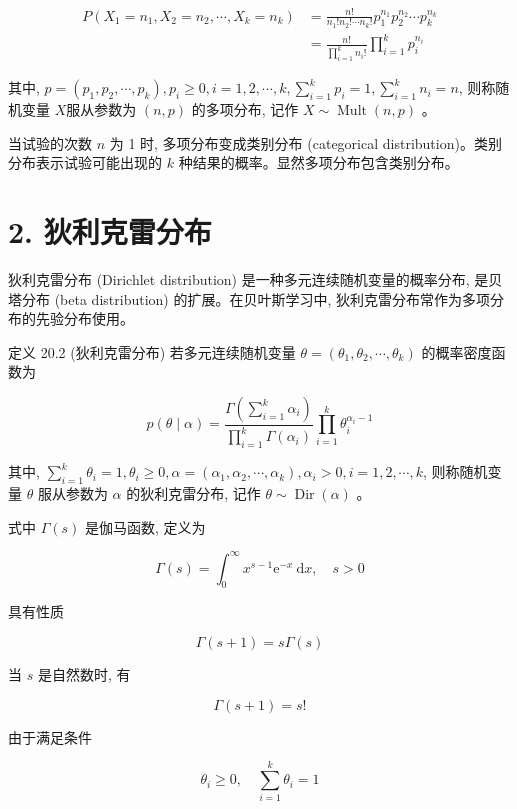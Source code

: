 \documentclass[10pt]{article}
\begin{document}
\begin{CJK*}{UTF8}{bsmi}
\begin{align*}
P\left(X_{1}=n_{1}, X_{2}=n_{2}, \cdots, X_{k}=n_{k}\right) & =\frac{n !}{n_{1} ! n_{2} ! \cdots n_{k} !} p_{1}^{n_{1}} p_{2}^{n_{2}} \cdots p_{k}^{n_{k}} \\
& =\frac{n !}{\prod_{i=1}^{k} n_{i} !} \prod_{i=1}^{k} p_{i}^{n_{i}} \tag{20.1}
\end{align*}


其中, $p=\left(p_{1}, p_{2}, \cdots, p_{k}\right), p_{i} \geqslant 0, i=1,2, \cdots, k, \sum_{i=1}^{k} p_{i}=1, \sum_{i=1}^{k} n_{i}=n$, 则称随机变量 $X$服从参数为 $(n, p)$ 的多项分布, 记作 $X \sim \operatorname{Mult}(n, p)$ 。

当试验的次数 $n$ 为 1 时, 多项分布变成类别分布 (categorical distribution)。类别分布表示试验可能出现的 $k$ 种结果的概率。显然多项分布包含类别分布。

\section*{2. 狄利克雷分布}
狄利克雷分布 (Dirichlet distribution) 是一种多元连续随机变量的概率分布, 是贝塔分布 (beta distribution) 的扩展。在贝叶斯学习中, 狄利克雷分布常作为多项分布的先验分布使用。

定义 20.2 (狄利克雷分布) 若多元连续随机变量 $\theta=\left(\theta_{1}, \theta_{2}, \cdots, \theta_{k}\right)$ 的概率密度函数为


\begin{equation*}
p(\theta \mid \alpha)=\frac{\Gamma\left(\sum_{i=1}^{k} \alpha_{i}\right)}{\prod_{i=1}^{k} \Gamma\left(\alpha_{i}\right)} \prod_{i=1}^{k} \theta_{i}^{\alpha_{i}-1} \tag{20.2}
\end{equation*}


其中, $\sum_{i=1}^{k} \theta_{i}=1, \theta_{i} \geqslant 0, \alpha=\left(\alpha_{1}, \alpha_{2}, \cdots, \alpha_{k}\right), \alpha_{i}>0, i=1,2, \cdots, k$, 则称随机变量 $\theta$ 服从参数为 $\alpha$ 的狄利克雷分布, 记作 $\theta \sim \operatorname{Dir}(\alpha)$ 。

式中 $\Gamma(s)$ 是伽马函数, 定义为

$$
\Gamma(s)=\int_{0}^{\infty} x^{s-1} \mathrm{e}^{-x} \mathrm{~d} x, \quad s>0
$$

具有性质

$$
\Gamma(s+1)=s \Gamma(s)
$$

当 $s$ 是自然数时, 有

$$
\Gamma(s+1)=s !
$$

由于满足条件

$$
\theta_{i} \geqslant 0, \quad \sum_{i=1}^{k} \theta_{i}=1
$$


\end{CJK*}
\end{document}
